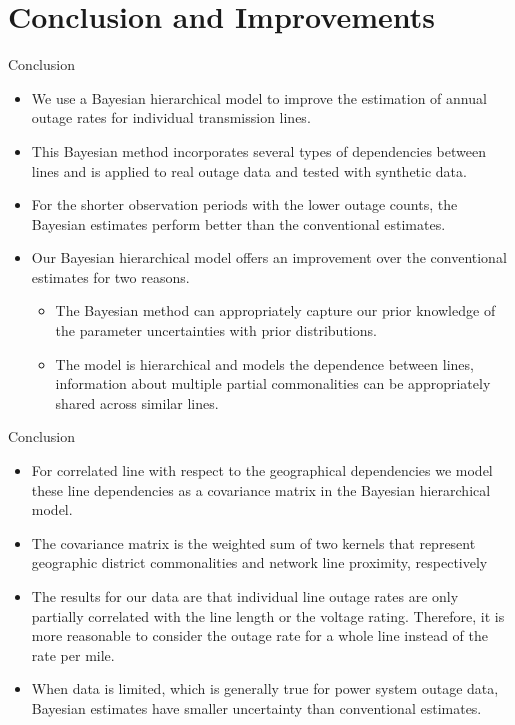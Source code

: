 \documentclass{beamer}
\begin{document}
\section{ Conclusion and Improvements}
\begin{frame}{Conclusion}
\begin{block}{}
\begin{itemize}


\item We use a Bayesian hierarchical model to improve the estimation of annual outage rates for individual transmission lines.
\item This
Bayesian method incorporates several types of dependencies
between lines and is applied to real outage data and tested with
synthetic data.

\item  For the shorter observation periods
with the lower outage counts, the Bayesian estimates perform
better than the conventional estimates.

\item Our Bayesian hierarchical model offers an improvement over
the conventional estimates for two reasons.  
\begin{itemize}
    \item The Bayesian
method can appropriately capture our prior knowledge of the parameter uncertainties with prior distributions.

  \item The model is hierarchical and models the dependence between
lines, information about multiple partial commonalities can be
appropriately shared across similar lines.
\end{itemize}
\end{itemize}
\end{block}
\end{frame}






\begin{frame}{Conclusion}
\begin{block}{}
\begin{itemize}
  \item For correlated line with respect to the geographical dependencies we model these line dependencies as a covariance matrix in
the Bayesian hierarchical model.
\item The covariance matrix is the
weighted sum of two kernels that represent geographic district
commonalities and network line proximity, respectively

\item The results for our data are that
individual line outage rates are only partially correlated with the
line length or the voltage rating. Therefore, it is more reasonable to consider the outage rate for a whole line instead of the rate
per mile.
\item When data is limited, which is generally true for power system
outage data, Bayesian estimates have smaller uncertainty than
conventional estimates.


\end{itemize}
\end{block}
\end{frame}
\end{document}
